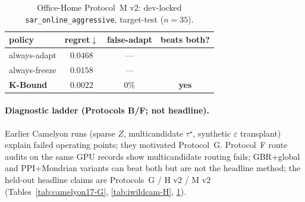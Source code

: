 \documentclass[conference]{IEEEtran}
\theoremstyle{plain}
\theoremstyle{definition}
\begin{document}
\begin{table}[t]\centering\small
\caption{Office-Home Protocol~M v2: dev-locked \texttt{sar\_online\_aggressive}, target-test ($n{=}35$).}
\label{tab:officehome-M}
\begin{tabular}{lccc}
\toprule
policy & regret$\downarrow$ & false-adapt & beats both? \\
\midrule
always-adapt  & $0.0468$ & --- & \\
always-freeze & $0.0158$ & --- & \\
\textbf{K-Bound} & $\mathbf{0.0022}$ & $0\%$ & \textbf{yes} \\
\bottomrule
\end{tabular}
\end{table}
\FloatBarrier

\paragraph{Diagnostic ladder (Protocols B/F; not headline).}
Earlier Camelyon runs (sparse $Z$, multicandidate $\tau^\star$, synthetic $\varepsilon$ transplant)
explain failed operating points; they motivated Protocol~G. Protocol~F route audits on the same GPU
records show multicandidate routing fails; GBR+global and PPI+Mondrian variants can beat both but
are not the headline method; the held-out headline claims are Protocols~G / H v2 / M v2
(Tables~\ref{tab:camelyon17-G}, \ref{tab:iwildcam-H}, \ref{tab:officehome-M}).
\end{document}
